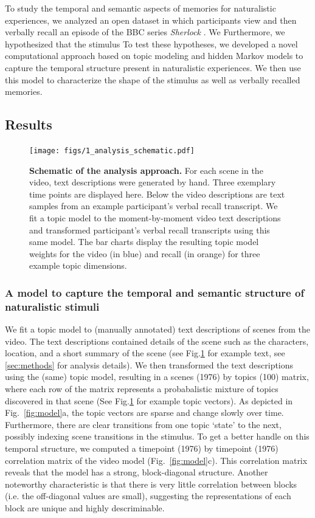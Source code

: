\documentclass{article}
\begin{document}
{To study the temporal and semantic aspects of memories for naturalistic experiences, we analyzed an open dataset in which participants view and then verbally recall an episode of the BBC series \textit{Sherlock}  \citep{ChenEtal17}. We Furthermore, we hypothesized that the stimulus To test these hypotheses, we developed a novel computational approach based on topic modeling \citep{BleiEtal03} and hidden Markov models \citep{Rabi89, BaldEtal17} to capture the temporal structure present in naturalistic experiences. We then use this model to characterize the shape of the stimulus as well as verbally recalled memories.

\subsection{Results}

\begin{figure}[t!]
\centering
\texttt{[image: figs/1\_analysis\_schematic.pdf]}
\caption{\small \textbf{Schematic of the analysis approach.} For each scene in the video, text descriptions were generated by hand. Three exemplary time points are displayed here.  Below the video descriptions are text samples from an example participant's verbal recall transcript.  We fit a topic model to the moment-by-moment video text descriptions and transformed participant's verbal recall transcripts using this same model. The bar charts display the resulting topic model weights for the video (in blue) and recall (in orange) for three example topic dimensions.}
\label{fig:schematic}
\end{figure}

\subsubsection{A model to capture the temporal and semantic structure of naturalistic stimuli}
We fit a topic model \citep{BleiEtal03} to (manually annotated) text descriptions of scenes from the video. The text descriptions contained details of the scene such as the characters, location, and a short summary of the scene (see Fig.\ref{fig:schematic} for example text, see \ref{sec:methods} for analysis details). We then transformed the text descriptions using the (same) topic model, resulting in a scenes (1976) by topics (100) matrix, where each row of the matrix represents a probabalistic mixture of topics discovered in that scene (See Fig.\ref{fig:schematic} for example topic vectors). As depicted in Fig.~\ref{fig:model}a, the topic vectors are sparse and change slowly over time. Furthermore, there are clear transitions from one topic `state' to the next, possibly indexing scene transitions in the stimulus. To get a better handle on this temporal structure, we computed a timepoint (1976) by timepoint (1976) correlation matrix of the video model (Fig.~\ref{fig:model}c).  This correlation matrix reveals that the model has a strong, block-diagonal structure. Another noteworthy characteristic is that there is very little correlation between blocks (i.e. the off-diagonal values are small), suggesting the representations of each block are unique and highly descriminable.

}
\end{document}
